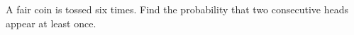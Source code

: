 A fair coin is tossed six times. Find the probability that two consecutive heads appear at least once.
